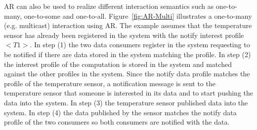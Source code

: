 AR can also be used to realize different interaction semantics such as one-to-many, one-to-some and one-to-all. Figure~\ref{fig:AR-Multi} illustrates a one-to-many (e.g. multicast) interaction using AR. The example assumes that the temperature sensor has already been registered in the system with the notify interest profile $<T1>$. In step (1) the two data consumers register in the system requesting to be notified if there are data stored in the system matching the profile. In step (2) the interest profile of the computation is stored in the system and matched against the other profiles in the system. Since the notify data profile matches the profile of the temperature sensor, a notification message is sent to the temperature sensor that someone is interested in its data and to start pushing the data into the system. In step (3) the temperature sensor published data into the system. In step (4) the data published by the sensor matches the notify data profile of the two consumers so both consumers are notified with the data.